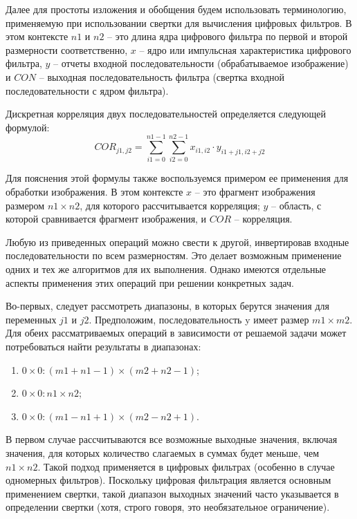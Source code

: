 Далее для простоты изложения и обобщения будем использовать терминологию, применяемую при использовании свертки для вычисления цифровых фильтров. В этом контексте $n1$ и $n2$ – это длина ядра цифрового фильтра по первой и второй размерности соответственно, $x$ – ядро или импульсная характеристика цифрового фильтра, $y$ – отчеты входной последовательности (обрабатываемое изображение) и $CON$ – выходная последовательность фильтра (свертка входной последовательности с ядром фильтра). 

Дискретная корреляция двух последовательностей определяется следующей формулой: 
\begin{equation}
	\label{eq:equation3.5.2}
	COR_{j1,j2} = \sum_{i1 =0}^{n1-1} \sum_{i2 =0}^{n2-1} x_{i1,i2} \cdot y_{i1+j1,i2+j2}
\end{equation}

Для пояснения этой формулы также воспользуемся примером ее применения для обработки изображения. В этом контексте $x$ – это фрагмент изображения размером $ n1 \times n2 $, для которого рассчитывается корреляция; $y$ – область, с которой сравнивается фрагмент изображения, и $COR$ – корреляция.

Любую из приведенных операций можно свести к другой, инвертировав входные последовательности по всем размерностям. Это делает возможным применение одних и тех же алгоритмов для их выполнения. Однако имеются
отдельные аспекты применения этих операций при решении конкретных задач.

Во-первых, следует рассмотреть диапазоны, в которых берутся значения для переменных $j1$ и $j2$. Предположим, последовательность y имеет размер $m1 \times m2$. Для обеих рассматриваемых операций в зависимости от решаемой задачи может потребоваться найти результаты в диапазонах: 
\begin{enumerate}
	\item $0 \times 0: (m1 + n1 - 1) \times (m2 + n2 - 1)$;
	
	\item	$0 \times 0: n1 \times n2$;
	
	\item $0 \times 0: (m1 - n1 + 1) \times (m2 - n2 + 1)$. 
\end{enumerate}

В первом случае рассчитываются все возможные выходные значения, включая значения, для которых количество слагаемых в суммах будет меньше, чем $n1 \times n2$. Такой подход применяется в цифровых фильтрах (особенно в случае одномерных фильтров). Поскольку цифровая фильтрация является основным применением свертки, такой диапазон выходных значений часто указывается в определении свертки (хотя, строго говоря, это необязательное ограничение).

